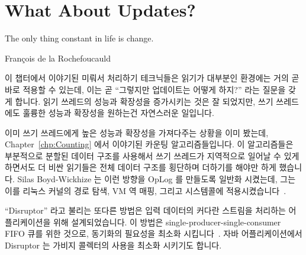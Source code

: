 
\section{What About Updates?}
\label{sec:defer:What About Updates?}
%
\epigraph{The only thing constant in life is change.}
	 {Fran\c{c}ois de la Rochefoucauld}

이 챕터에서 이야기된 미뤄서 처리하기 테크닉들은 읽기가 대부분인 환경에는 거의
곧바로 적용할 수 있는데, 이는 곧 ``그렇지만 업데이트는 어떻게 하지?'' 라는
질문을 갖게 합니다.
읽기 쓰레드의 성능과 확장성을 증가시키는 것은 잘 되었지만, 쓰기 쓰레드에도
훌륭한 성능과 확장성을 원하는건 자연스러운 일입니다.
\iffalse

The deferred-processing techniques called out in this chapter are most
directly applicable to read-mostly situations, which begs the question
``But what about updates?''
After all, increasing the performance and scalability of readers is all
well and good, but it is only natural to also want great performance and
scalability for writers.
\fi

이미 쓰기 쓰레드에게 높은 성능과 확장성을 가져다주는 상황을 이미 봤는데,
Chapter~\ref{chp:Counting} 에서 이야기된 카운팅 알고리즘들입니다.
이 알고리즘들은 부분적으로 분할된 데이터 구조를 사용해서 쓰기 쓰레드가
지역적으로 일어날 수 있게 하면서도 더 비싼 읽기들은 전체 데이터 구조를 횡단하며
더하기를 해야만 하게 했습니다.
Silas Boyd-Wickhize 는 이런 방향을 OpLog 를 만들도록 일반화 시켰는데, 그는 이를
리눅스 커널의 경로 탐색, VM 역 매핑, 그리고  시스템콜에
적용시켰습니다~\cite{SilasBoydWickizerPhD}.
\iffalse

We have already seen one situation featuring high performance and
scalability for writers, namely the counting algorithms surveyed in
Chapter~\ref{chp:Counting}.
These algorithms featured partially partitioned data structures so
that updates can operate locally, while the more-expensive reads
must sum across the entire data structure.
Silas Boyd-Wickhizer has generalized this notion to produce
OpLog, which he has applied to
Linux-kernel pathname lookup, VM reverse mappings, and the \co{stat()} system
call~\cite{SilasBoydWickizerPhD}.
\fi

``Disruptor'' 라고 불리는 또다른 방법은 입력 데이터의 커다란 스트림을 처리하는
어플리케이션을 위해 설계되었습니다.
이 방법은 single-producer-single-consumer FIFO 큐를 위한 것으로, 동기화의
필요성을 최소화 시킵니다~\cite{AdrianSutton2013LCA:Disruptor}.
자바 어플리케이션에서 Disruptor 는 가비지 콜렉터의 사용을 최소화 시키기도
합니다.

